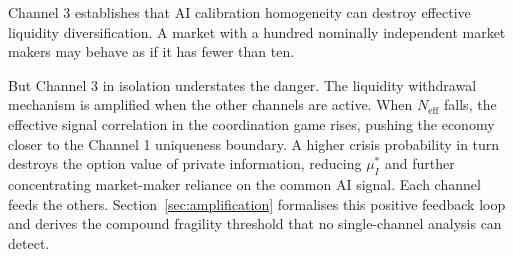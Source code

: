 Channel 3 establishes that AI calibration homogeneity can destroy effective liquidity diversification. A market with a hundred nominally independent market makers may behave as if it has fewer than ten.

But Channel 3 in isolation understates the danger. The liquidity withdrawal mechanism is amplified when the other channels are active. When $N_{\text{eff}}$ falls, the effective signal correlation in the coordination game rises, pushing the economy closer to the Channel 1 uniqueness boundary. A higher crisis probability in turn destroys the option value of private information, reducing $\mu_I^*$ and further concentrating market-maker reliance on the common AI signal. Each channel feeds the others. Section~\ref{sec:amplification} formalises this positive feedback loop and derives the compound fragility threshold that no single-channel analysis can detect.

